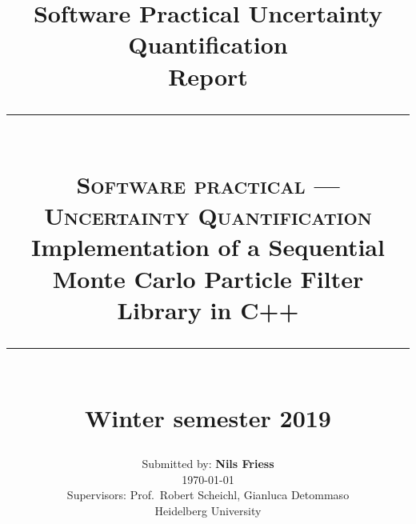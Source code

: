 \documentclass[
fontsize=11pt,
paper=a4,
numbers=noenddot,
parskip=half
]{scrartcl}
\title{{\normalsize Software Practical Uncertainty Quantification}\\Report}
\newcommand{\HRule}{\rule{.9\linewidth}{.6pt}}
\begin{document}
\title{ \normalsize
  \HRule\\[0.5cm]
  \large \textsc{Software practical --- Uncertainty Quantification}\\
  \LARGE {Implementation of a Sequential Monte Carlo Particle Filter Library in C++}\\
  \HRule\\[0.5cm]
  \normalsize Winter semester 2019 \vfill }

\date{}

\author{ \large
  Submitted by: \textbf{Nils Friess}\\
  {\small\today}\\[3ex]
  \normalsize
  Supervisors: Prof.\ Robert Scheichl, Gianluca Detommaso \\
  \normalsize Heidelberg University }

\clearpage\maketitle
\thispagestyle{empty}
\newpage
\setcounter{page}{1}


 
\printbibliography
\end{document}
